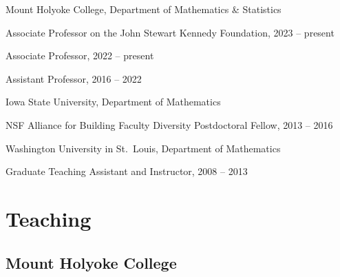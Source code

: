 \documentclass[10pt,letterpaper]{article}
\renewenvironment{itemize}{
  \begin{list}{}{
    \setlength{\leftmargin}{1.5em}
    \setlength{\itemsep}{0.25em}
    \setlength{\parskip}{0pt}
    \setlength{\parsep}{0.25em}
  }
}{
  \end{list}
}
\providecommand{\tightlist}{%
  \setlength{\itemsep}{0pt}\setlength{\parskip}{0pt}}
\let\tightlist\relax
\begin{document}
\begin{itemize}
\tightlist
\item
  Mount Holyoke College, Department of Mathematics \& Statistics

  \begin{itemize}
  \tightlist
  \item
    Associate Professor on the John Stewart Kennedy Foundation, 2023 --
    present
  \item
    Associate Professor, 2022 -- present
  \item
    Assistant Professor, 2016 -- 2022
  \end{itemize}
\item
  Iowa State University, Department of Mathematics

  \begin{itemize}
  \tightlist
  \item
    NSF Alliance for Building Faculty Diversity Postdoctoral Fellow,
    2013 -- 2016
  \end{itemize}
\item
  Washington University in St.~Louis, Department of Mathematics

  \begin{itemize}
  \tightlist
  \item
    Graduate Teaching Assistant and Instructor, 2008 -- 2013
  \end{itemize}
\end{itemize}

\hypertarget{teaching}{%
\section*{Teaching}\label{teaching}}

\hypertarget{mount-holyoke-college}{%
\subsection*{Mount Holyoke College}\label{mount-holyoke-college}}
\end{document}
